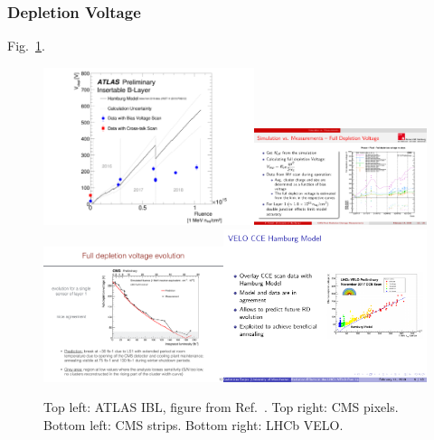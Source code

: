 \subsubsection{Depletion Voltage}

Fig.~\ref{lab:sensormeasurements:Depletion:ATLAS1}.

\begin{figure}[h!]
\centering
\includegraphics[width=0.55\textwidth]{figures/SensorMeasurements/DepletionVoltage/atlas-ibl-depletion.pdf}\includegraphics[width=0.45\textwidth]{figures/SensorMeasurements/DepletionVoltage/cms-pixels}\\
\includegraphics[width=0.47\textwidth]{figures/SensorMeasurements/DepletionVoltage/cms-strips}\includegraphics[width=0.53\textwidth]{figures/SensorMeasurements/DepletionVoltage/lhcb-velo}
\caption{Top left: ATLAS IBL, figure from Ref.~\cite{ATL-INDET-INT-2019-016}.  Top right: CMS pixels.  Bottom left: CMS strips.  Bottom right: LHCb VELO.}
\label{lab:sensormeasurements:Depletion:ATLAS1}
\end{figure}

